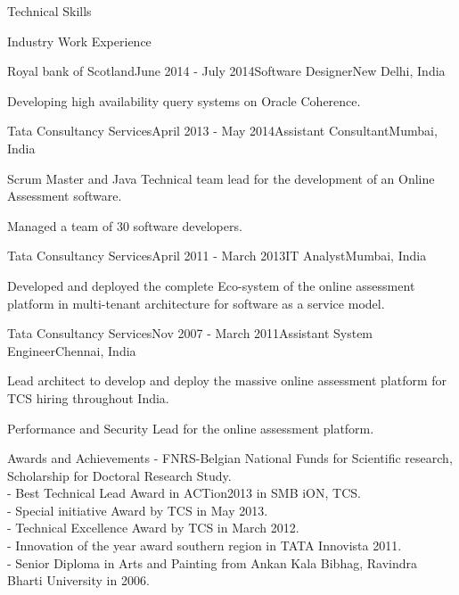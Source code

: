 \documentclass{resume} %
\begin{document}
\begin{rSection}{Technical Skills}
\begin{rSection}{Industry Work Experience}
\begin{rSubsection}{Royal bank of Scotland}{June 2014 - July 2014}{Software Designer}{New Delhi, India}
\item Developing high availability query systems on Oracle Coherence.
\end{rSubsection}
\begin{rSubsection}{Tata Consultancy Services}{April 2013 - May 2014}{Assistant Consultant}{Mumbai, India}
\item Scrum Master and Java Technical team lead for the development of an Online Assessment software. 
\item Managed a team of $30$ software developers.  
\end{rSubsection}
\begin{rSubsection}{Tata Consultancy Services}{April 2011 - March 2013}{IT Analyst}{Mumbai, India}
\item Developed and deployed the complete Eco-system of the online assessment platform in multi-tenant architecture for software as a service model.
\end{rSubsection}
\begin{rSubsection}{Tata Consultancy Services}{Nov 2007 - March 2011}{Assistant System Engineer}{Chennai, India}
\item Lead architect to develop and deploy the massive online assessment platform for TCS hiring throughout India.
\item Performance and Security Lead for the online assessment platform.
\end{rSubsection}
\end{rSection}


\end{rSection}
\begin{rSection}{Awards and Achievements}
- FNRS-Belgian National Funds for Scientific research, Scholarship for Doctoral Research Study.\\
- Best Technical Lead Award in ACTion2013 in SMB iON, TCS. \\
- Special initiative Award by TCS in May 2013.\\
- Technical Excellence Award by TCS in March 2012.\\
- Innovation of the year award southern region in TATA Innovista 2011.\\
- Senior Diploma in Arts and Painting from Ankan Kala Bibhag, Ravindra Bharti University in 2006.\\
\end{rSection}
\end{document}
